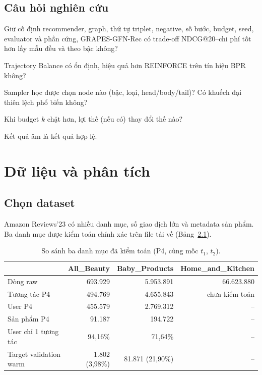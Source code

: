 \documentclass[11pt,a4paper,oneside]{report}
\begin{document}
\section{Câu hỏi nghiên cứu}
\begin{description}[leftmargin=1.2cm]
\item[RQ1] Giữ cố định recommender, graph, thứ tự triplet, negative, số bước, budget, seed, evaluator và phần cứng, GRAPES-GFN-Rec có trade-off NDCG@20--chi phí tốt hơn lấy mẫu đều và theo bậc không?
\item[RQ2] Trajectory Balance có ổn định, hiệu quả hơn REINFORCE trên tín hiệu BPR không?
\item[RQ3] Sampler học được chọn node nào (bậc, loại, head/body/tail)? Có khuếch đại thiên lệch phổ biến không?
\item[RQ4] Khi budget $k$ chặt hơn, lợi thế (nếu có) thay đổi thế nào?
\end{description}
Kết quả âm là kết quả hợp lệ.

\chapter{Dữ liệu và phân tích}\label{ch:data}

\section{Chọn dataset}
Amazon Reviews'23 \cite{amazon23} có nhiều danh mục, số giao dịch lớn và metadata sản phẩm. Ba danh mục được kiểm toán chính xác trên file tải về (Bảng~\ref{tab:portfolio}).

\begin{table}[h]
\centering\small
\caption{So sánh ba danh mục đã kiểm toán (P4, cùng mốc $t_1$, $t_2$).}\label{tab:portfolio}
\begin{tabular}{lrrr}
\toprule
 & All\_Beauty & Baby\_Products & Home\_and\_Kitchen \\
\midrule
Dòng raw & 693.929 & 5.953.891 & 66.623.880 \\
Tương tác P4 & 494.769 & 4.655.843 & chưa kiểm toán \\
User P4 & 455.579 & 2.769.312 & -- \\
Sản phẩm P4 & 91.187 & 194.722 & -- \\
User chỉ 1 tương tác & 94,16\% & 71,64\% & -- \\
Target validation warm & 1.802 (3,98\%) & 81.871 (21,90\%) & -- \\
\bottomrule
\end{tabular}
\end{table}
\end{document}
